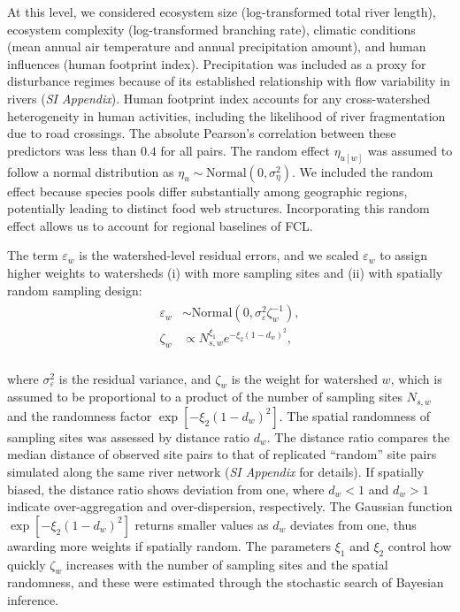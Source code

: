 \documentclass[9pt,twocolumn,twoside]{pnas-new}
\begin{document}
At this level, we considered ecosystem size (log-transformed total river length), ecosystem complexity (log-transformed branching rate), climatic conditions (mean annual air temperature and annual precipitation amount), and human influences (human footprint index).
Precipitation was included as a proxy for disturbance regimes because of its established relationship with flow variability in rivers (\textit{SI Appendix}).
Human footprint index accounts for any cross-watershed heterogeneity in human activities, including the likelihood of river fragmentation due to road crossings.
The absolute Pearson’s correlation between these predictors was less than $0.4$ for all pairs.
The random effect $\eta_{u[w]}$ was assumed to follow a normal distribution as $\eta_{u} \sim \mbox{Normal}(0, \sigma_{\eta}^2)$.
We included the random effect because species pools differ substantially among geographic regions, potentially leading to distinct food web structures.
Incorporating this random effect allows us to account for regional baselines of FCL.

The term $\varepsilon_w$ is the watershed-level residual errors, and we scaled $\varepsilon_w$ to assign higher weights to watersheds (i) with more sampling sites and (ii) with spatially random sampling design:
\\
\begin{align}
\begin{split}
    \varepsilon_w &\sim \mbox{Normal}(0, \sigma_{\varepsilon}^2 \zeta_w^{-1}),\\
    \zeta_w &\propto N_{s, w}^{\xi_1} e^{-\xi_2 (1 - d_{w})^2},
\end{split}
\end{align}
\\
where $\sigma_{\varepsilon}^2$ is the residual variance, and $\zeta_w$ is the weight for watershed $w$, which is assumed to be proportional to a product of the number of sampling sites $N_{s,w}$ and the randomness factor $\exp[-\xi_2 (1 - d_{w})^2]$.
The spatial randomness of sampling sites was assessed by distance ratio $d_{w}$.
The distance ratio compares the median distance of observed site pairs to that of replicated ``random'' site pairs simulated along the same river network (\textit{SI Appendix} for details).
If spatially biased, the distance ratio shows deviation from one, where $d_{w} < 1$ and $d_{w} > 1$ indicate over-aggregation and over-dispersion, respectively.
The Gaussian function $\exp[-\xi_2 (1 - d_{w})^2]$ returns smaller values as $d_{w}$ deviates from one, thus awarding more weights if spatially random.
The parameters $\xi_1$ and $\xi_2$ control how quickly $\zeta_w$ increases with the number of sampling sites and the spatial randomness, and these were estimated through the stochastic search of Bayesian inference.
\end{document}
